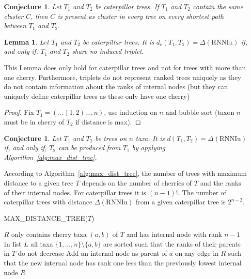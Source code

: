 \documentclass[11pt, a4paper]{article}
\newcommand{\rnniu}{\mathrm{RNNIu}}
\newtheorem{conjecture}[definition]{Conjecture}
\newtheorem{lemma}[definition]{Lemma}
\begin{document}

\begin{conjecture}
    Let $T_1$ and $T_2$ be caterpillar trees.
    If $T_1$ and $T_2$ contain the same cluster $C$, then $C$ is present as cluster in every tree on every shortest path between $T_1$ and $T_2$. 
\end{conjecture}



\begin{lemma}
    Let $T_1$ and $T_2$ be caterpillar trees.
    It is $d_c(T_1,T_2) = \Delta(\rnniu)$ if, and only if, $T_1$ and $T_2$ share no induced triplet.
\end{lemma}

This Lemma does only hold for caterpillar trees and not for trees with more than one cherry.
Furthermore, triplets do not represent ranked trees uniquely as they do not contain information about the ranks of internal nodes (but they can uniquely define caterpillar trees as these only have one cherry)

\begin{proof}
    Fix $T_1 = (\ldots(1,2) \ldots ,n)$, use induction on $n$ and bubble sort (taxon $n$ must be in cherry of $T_2$ if distance is max).
\end{proof}

\begin{conjecture}
    Let $T_1$ and $T_2$ be trees on $n$ taxa.
    It is $d(T_1,T_2) = \Delta(\rnniu)$ if, and only if, $T_2$ can be produced from $T_1$ by applying Algorithm~\ref{alg:max_dist_tree}.
\end{conjecture}

According to Algorithm~\ref{alg:max_dist_tree}, the number of trees with maximum distance to a given tree $T$ depends on the number of cherries of $T$ and the ranks of their internal nodes.
For caterpillar trees it is $(n-1)!$.
The number of caterpillar trees with distance $\Delta(\rnniu)$ from a given caterpillar tree is $2^{n-2}$.

\begin{algorithm}[H]
\caption{MAX\_DISTANCE\_TREE($T$)}
\label{alg:max_dist_tree}
\begin{algorithmic}[1]
	\STATE $R$ only contains cherry taxa $(a,b)$ of $T$ and has internal node with rank $n-1$
    \STATE In list $L$ all taxa $\{1,\ldots,n\}\setminus\{a,b\}$ are sorted such that the ranks of their parents in $T$ do not decrease
		\STATE Add an internal node as parent of $a$ on any edge in $R$ such that the new internal node has rank one less than the previously lowest internal node
	\ENDFOR
	\RETURN $R$
\end{algorithmic}
\end{algorithm}
\end{document}
